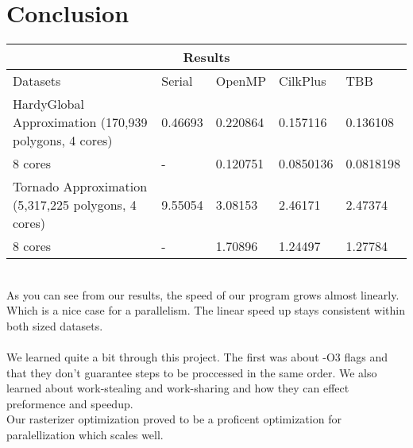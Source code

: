 \chapter*{Conclusion}


\begin{tabular}{ |p{5cm}|p{1.5cm}|p{1.5cm}|p{1.5cm}|p{1.5cm}|  }
 \hline
 \multicolumn{5}{|c|}{Results} \\
 \hline
 Datasets & Serial & OpenMP & CilkPlus & TBB\\
 \hline
 HardyGlobal Approximation (170,939 polygons, 4 cores) & 0.46693 & 0.220864 & 0.157116 & 0.136108\\
 8 cores & - & 0.120751 & 0.0850136 & 0.0818198\\
 \hline
 Tornado Approximation (5,317,225 polygons, 4 cores) & 9.55054 & 3.08153 & 2.46171 & 2.47374\\
 8 cores & - & 1.70896 & 1.24497 & 1.27784\\
 \hline
\end{tabular}
\vspace{10mm}
\\
As you can see from our results, the speed of our program grows almost linearly. Which is a nice case for a parallelism. The linear speed up stays consistent within both sized datasets.\\
\\
We learned quite a bit through this project. The first was about -O3 flags and that they don't guarantee steps to be proccessed in the same order. We also learned about work-stealing and work-sharing and how they can effect preformence and speedup.
\\
Our rasterizer optimization proved to be a proficent optimization for paralellization which scales well. 

